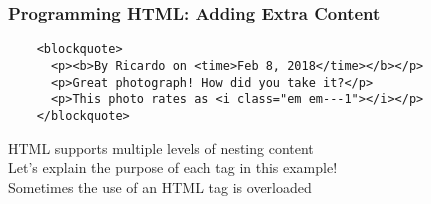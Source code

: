 \documentclass[14pt,aspectratio=169]{beamer}
\begin{document}
%
\begin{frame}[fragile]
  \frametitle{Programming HTML: Adding Extra Content}
  \normalsize
  \hspace*{-.25in}
  \begin{minipage}{6in}
    \vspace*{.25in}
    \begin{verbatim}
    <blockquote>
      <p><b>By Ricardo on <time>Feb 8, 2018</time></b></p>
      <p>Great photograph! How did you take it?</p>
      <p>This photo rates as <i class="em em---1"></i></p>
    </blockquote>
    \end{verbatim}
  \end{minipage}
  \vspace*{.05in}
  \begin{center}
    \normalsize \noindent HTML supports multiple levels of nesting content \\
    \normalsize \noindent Let's explain the purpose of each tag in this example! \\
    \normalsize \noindent Sometimes the use of an HTML tag is overloaded \\
  \end{center}
\end{frame}
\end{document}

